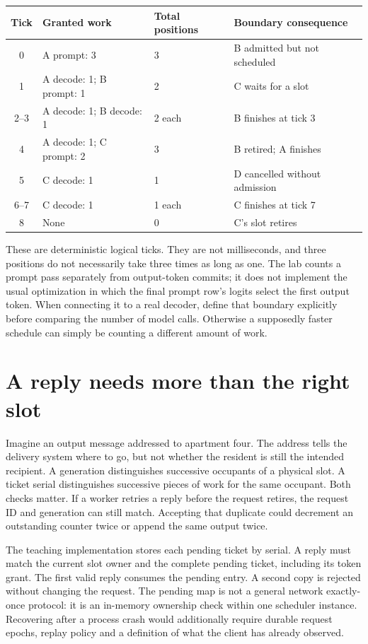 \begin{center}
\begin{tabular}{@{}clll@{}}
\toprule
Tick & Granted work & Total positions & Boundary consequence\\
\midrule
0 & A prompt: 3 & 3 & B admitted but not scheduled\\
1 & A decode: 1; B prompt: 1 & 2 & C waits for a slot\\
2--3 & A decode: 1; B decode: 1 & 2 each & B finishes at tick 3\\
4 & A decode: 1; C prompt: 2 & 3 & B retired; A finishes\\
5 & C decode: 1 & 1 & D cancelled without admission\\
6--7 & C decode: 1 & 1 each & C finishes at tick 7\\
8 & None & 0 & C's slot retires\\
\bottomrule
\end{tabular}
\end{center}

These are deterministic logical ticks. They are not milliseconds, and
three positions do not necessarily take three times as long as one.
The lab counts a prompt pass separately from output-token commits; it
does not implement the usual optimization in which the final prompt row's
logits select the first output token. When connecting it to a real decoder,
define that boundary explicitly before comparing the number of model calls.
Otherwise a supposedly faster schedule can simply be counting a different
amount of work.

\section{A reply needs more than the right slot}

Imagine an output message addressed to apartment four. The address tells
the delivery system where to go, but not whether the resident is still
the intended recipient. A generation distinguishes successive occupants
of a physical slot. A ticket serial distinguishes successive pieces of
work for the same occupant. Both checks matter. If a worker retries a
reply before the request retires, the request ID and generation can still
match. Accepting that duplicate could decrement an outstanding counter
twice or append the same output twice.

The teaching implementation stores each pending ticket by serial.
A reply must match the current slot owner and the complete pending
ticket, including its token grant. The first valid reply consumes the
pending entry. A second copy is rejected without changing the request.
The pending map is not a general network exactly-once protocol: it is
an in-memory ownership check within one scheduler instance. Recovering
after a process crash would additionally require durable request epochs,
replay policy and a definition of what the client has already observed.

